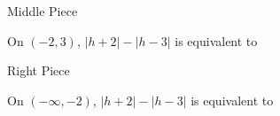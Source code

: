 \documentclass{ximera}
\begin{document}
\begin{exercise} Middle Piece


On $(-2, 3)$, $|h+2| - |h-3|$ is equivalent to


\begin{multipleChoice}
\end{multipleChoice}

\end{exercise}










\begin{exercise} Right Piece


On $(-\infty, -2)$, $|h+2| - |h-3|$ is equivalent to


\begin{multipleChoice}
\end{multipleChoice}

\end{exercise}
\end{document}
